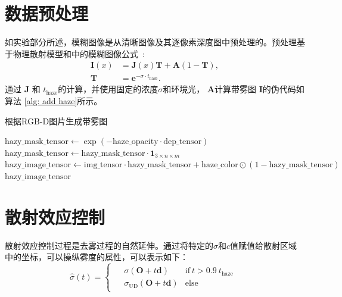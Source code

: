 \begin{appendices}
\section{数据预处理}

如实验部分所述，模糊图像是从清晰图像及其逐像素深度图中预处理的。预处理基于物理散射模型和中的模糊图像公式~\cite{kaiming_he_single_2009}:
\begin{equation}
\begin{split}
\mathbf{I}(x)&= \mathbf{J}(x) \mathbf{T} + \mathbf{A} (1-\mathbf{T}), \\
\mathbf{T}&=\mathbf{e}^{-\sigma \cdot t_\text{haze}}.\label{eq:physics image model}
\end{split}
\end{equation}
通过 $\mathbf{J}$ 和 $t_\text{haze}$的计算，并使用固定的浓度$\sigma$和环境光， $\mathbf{A}$计算带雾图 $\mathbf{I}$的伪代码如算法 \ref{alg: add haze}所示。


\begin{algorithm*}[t]
\caption{根据RGB-D图片生成带雾图}
\label{alg: add haze}
\begin{algorithmic}[1]
\State $\mathrm{hazy\_mask\_tensor} \gets \exp(-\mathrm{haze\_opacity} \cdot \mathrm{dep\_tensor})$
\State $\mathrm{hazy\_mask\_tensor} \gets \mathrm{hazy\_mask\_tensor} \cdot \mathbf{1}_{3 \times n \times m}$
\State $\mathrm{hazy\_image\_tensor} \gets \mathrm{img\_tensor} \cdot \mathrm{hazy\_mask\_tensor} + \mathrm{haze\_color} \odot (1 - \mathrm{hazy\_mask\_tensor})$
\State \Return $\mathrm{hazy\_image\_tensor}$
\EndProcedure
\end{algorithmic}
\end{algorithm*}

\section{散射效应控制}
散射效应控制过程是去雾过程的自然延伸。通过将特定的$\sigma$和$c$值赋值给散射区域中的坐标，可以操纵雾度的属性，可以表示如下：
\begin{equation}
    \hat\sigma (t) =
        \begin{cases}
            \begin{aligned}
                &\sigma(\mathbf{O}+t\mathbf{d})\: &\text{if}\: t > 0.9 \: t_\text{haze} \\
                &\sigma_{\text{UD}}(\mathbf{O}+t\mathbf{d})&\text{else}
            \end{aligned}
        \end{cases}
\end{equation}


\end{appendices}
